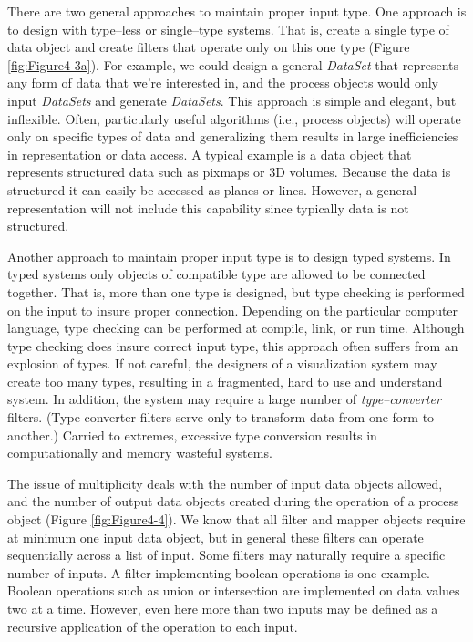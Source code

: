 There are two general approaches to maintain proper input type. One approach is to design with type--less or single--type systems. That is, create a single type of data object and create filters that operate only on this one type (Figure \ref{fig:Figure4-3a}). For example, we could design a general \emph{DataSet} that represents any form of data that we're interested in, and the process objects would only input \emph{DataSets} and generate \emph{DataSets}. This approach is simple and elegant, but inflexible. Often, particularly useful algorithms (i.e., process objects) will operate only on specific types of data and generalizing them results in large inefficiencies in representation or data access. A typical example is a data object that represents structured data such as pixmaps or 3D volumes. Because the data is structured it can easily be accessed as planes or lines. However, a general representation will not include this capability since typically data is not structured.

Another approach to maintain proper input type is to design typed systems. In typed systems only objects of compatible type are allowed to be connected together. That is, more than one type is designed, but type checking is performed on the input to insure proper connection. Depending on the particular computer language, type checking can be performed at compile, link, or run time. Although type checking does insure correct input type, this approach often suffers from an explosion of types. If not careful, the designers of a visualization system may create too many types, resulting in a fragmented, hard to use and understand system. In addition, the system may require a large number of \emph{type--converter} filters. (Type-converter filters serve only to transform data from one form to another.) Carried to extremes, excessive type conversion results in computationally and memory wasteful systems.

The issue of multiplicity deals with the number of input data objects allowed, and the number of output data objects created during the operation of a process object (Figure \ref{fig:Figure4-4}). We know that all filter and mapper objects require at minimum one input data object, but in general these filters can operate sequentially across a list of input. Some filters may naturally require a specific number of inputs. A filter implementing boolean operations is one example. Boolean operations such as union or intersection are implemented on data values two at a time. However, even here more than two inputs may be defined as a recursive application of the operation to each input.

